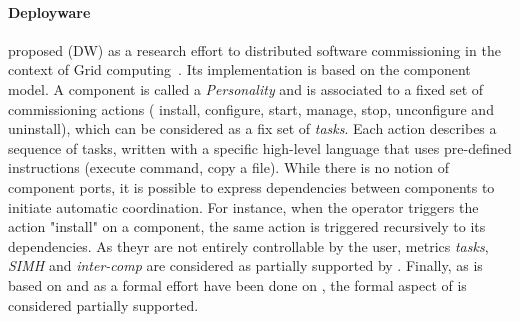 \paragraph{Deployware}
\citeauthor{flissi2008ccgrid} proposed \deployware (DW) as a research
effort to distributed software commissioning in the context of Grid
computing~\cite{flissi2008ccgrid}. Its implementation is based on the
\fractal component model. A component is called a \emph{Personality}
and is associated to a fixed set of commissioning actions (\ie
install, configure, start, manage, stop, unconfigure and uninstall),
which can be considered as a fix set of \emph{tasks}.  Each action
describes a sequence of tasks, written with a specific high-level
language that uses pre-defined instructions (\eg execute command, copy
a file). While there is no notion of component ports, it is possible
to express dependencies between components to initiate automatic
coordination. For instance, when the operator triggers the action
"install" on a component, the same action is triggered recursively to
its dependencies. As theyr are not entirely controllable by the user,
metrics \emph{tasks}, \emph{SIMH} and \emph{inter-comp} are considered
as partially supported by \deployware. Finally, as \deployware is
based on \fractal and as a formal effort have been done on \fractal,
the formal aspect of \deployware is considered partially supported.

